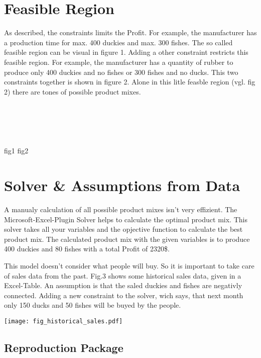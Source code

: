 \documentclass{article}
\begin{document}
\begin{multicols}{2}
\section{Feasible Region}
As described, the constraints limits the Profit. For example, the manufacturer has a production time for max. 400 duckies and max. 300 fishes. The so called feasible region can be visual in figure 1. Adding a other constraint restricts this feasible region. For example, the manufacturer has a quantity of rubber to produce only 400 duckies and no fishes or 300 fishes and no ducks. This two constraints together is shown in figure 2. Alone in this litle feasble region (vgl. fig 2) there are tones of possible product mixes. \\ \\ \\ \\ \\ \\

fig1        fig2


\section{Solver \& Assumptions from Data}
A manualy calculation of all possible product mixes isn't very effizient. The Microsoft-Excel-Plugin \glqq Solver\grqq{} helps to calculate the optimal product mix. This solver takes all your variables and the opjective function to calculate the best product mix. The calculated product mix with the given variables is to produce 400 duckies and 80 fishes with a total Profit of 2320\$.

This model doesn't consider what people will buy. So it is important to take care of sales data from the past. Fig.3 shows some historical sales data, given in a Excel-Table. An assumption is that the saled duckies and fishes are negativly connected. Adding a new constraint to the solver, wich says, that next month only 150 ducks and 50 fishes will be buyed by the people.


\centering
\texttt{[image: fig\_historical\_sales.pdf]}


\end{multicols}
\begin{center}
\section*{Reproduction Package}
\end{center}
\end{document}
